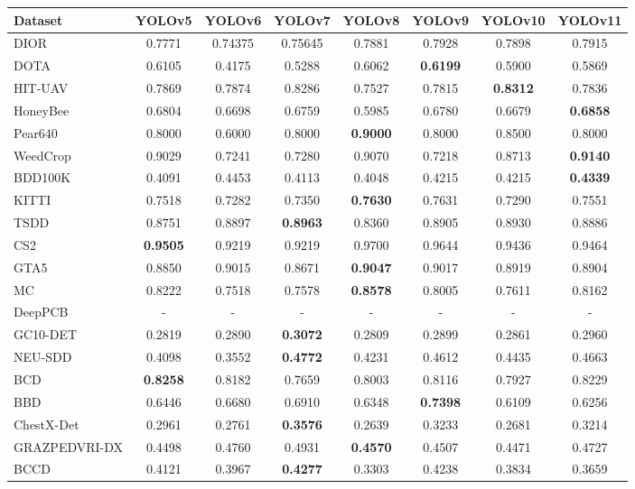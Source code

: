 \documentclass[runningheads]{llncs}
\begin{document}
\begin{table}[htbp]
\centering
\begin{tabular}{lccccccc}
\hline
Dataset & YOLOv5 & YOLOv6 & YOLOv7 & YOLOv8 & YOLOv9 & YOLOv10 & YOLOv11 \\
\hline
DIOR & 0.7771& 0.74375& 0.75645& 0.7881& 0.7928& 0.7898& 0.7915
\\
DOTA & 0.6105& 0.4175 & 0.5288 & 0.6062 & \textbf{0.6199} & 0.5900 & 0.5869 \\
HIT-UAV& 0.7869 & 0.7874 & 0.8286 & 0.7527 & 0.7815 & \textbf{0.8312} & 0.7836 \\
\hline
HoneyBee & 0.6804 & 0.6698 & 0.6759 & 0.5985 & 0.6780 & 0.6679 & \textbf{0.6858} \\
Pear640 & 0.8000 & 0.6000 & 0.8000 & \textbf{0.9000} & 0.8000 & 0.8500 & 0.8000 \\
WeedCrop & 0.9029 & 0.7241 & 0.7280 & 0.9070 & 0.7218 & 0.8713 & \textbf{0.9140} \\
\hline
BDD100K & 0.4091 & 0.4453 & 0.4113 & 0.4048 & 0.4215 & 0.4215 & \textbf{0.4339} \\
KITTI & 0.7518 & 0.7282 & 0.7350 & \textbf{0.7630} & 0.7631 & 0.7290 & 0.7551 \\
TSDD & 0.8751 & 0.8897 & \textbf{0.8963} & 0.8360 & 0.8905 & 0.8930 & 0.8886 \\
\hline
CS2 & \textbf{0.9505} & 0.9219 & 0.9219 & 0.9700 & 0.9644 & 0.9436 & 0.9464 \\
GTA5 & 0.8850 & 0.9015 & 0.8671 & \textbf{0.9047} & 0.9017 & 0.8919 & 0.8904 \\
MC & 0.8222 & 0.7518 & 0.7578 & \textbf{0.8578} & 0.8005 & 0.7611 & 0.8162 \\
\hline
DeepPCB & - & - & - & - & - & - & - \\
GC10-DET & 0.2819 & 0.2890 & \textbf{0.3072} & 0.2809 & 0.2899 & 0.2861 & 0.2960 \\
NEU-SDD & 0.4098 & 0.3552 & \textbf{0.4772} & 0.4231 & 0.4612 & 0.4435 & 0.4663 \\
\hline
BCD & \textbf{0.8258} & 0.8182 & 0.7659 & 0.8003 & 0.8116 & 0.7927 & 0.8229 \\
BBD & 0.6446 & 0.6680 & 0.6910 & 0.6348 & \textbf{0.7398} & 0.6109 & 0.6256 \\
ChestX-Det & 0.2961 & 0.2761 & \textbf{0.3576} & 0.2639 & 0.3233 & 0.2681 & 0.3214 \\
GRAZPEDVRI-DX & 0.4498 & 0.4760 & 0.4931 & \textbf{0.4570} & 0.4507 & 0.4471 & 0.4727 \\
\hline
BCCD & 0.4121 & 0.3967 & \textbf{0.4277} & 0.3303 & 0.4238 & 0.3834 & 0.3659 \\

\end{tabular}
\end{table}
\end{document}
